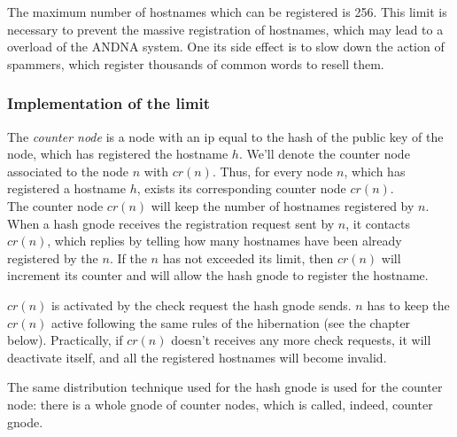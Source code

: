 \documentclass[a4paper]{article}
\begin{document}
The maximum number of hostnames which can be registered is 256.
This limit is necessary to prevent the massive registration of hostnames,
which may lead to a overload of the ANDNA system. One its side effect is to
slow down the action of spammers, which register thousands of common words to
resell them.

\subsubsection{Implementation of the limit}
The \emph{counter node} is a node with an ip equal to the hash of the public
key of the node, which has registered the hostname $h$. We'll denote the
counter node associated to the node $n$ with $cr(n)$.
Thus, for every node $n$, which has registered a hostname $h$, exists its
corresponding counter node $cr(n)$.\\

The counter node $cr(n)$ will keep the number of hostnames registered by
$n$.\\

When a hash gnode receives the registration request sent by $n$, it contacts
$cr(n)$, which replies by telling how many hostnames have been already registered
by the $n$. If the $n$ has not exceeded its limit, then $cr(n)$  will increment its counter
and will allow the hash gnode to register the hostname.

$cr(n)$ is activated by the check request the hash gnode sends. $n$ has to
keep the $cr(n)$ active following the same rules of the hibernation (see the
chapter below). Practically, if $cr(n)$ doesn't receives any more check
requests, it will deactivate itself, and all the registered hostnames will
become invalid.

The same distribution technique used for the hash gnode is used for the counter
node: there is a whole gnode of counter nodes, which is called, indeed,
counter gnode.
\end{document}
